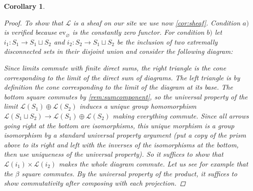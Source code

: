 \documentclass[11pt,A4]{article}
\theoremstyle{plain}
\newtheorem{cor}[thm]{Corollary}
\theoremstyle{definition}
\theoremstyle{remark}
\newcommand{\1}{\mathbbm{1}}
\newcommand{\F}{\mathcal{F}}
\renewcommand{\L}{\mathcal{L}}
\newcommand{\op}{\oplus}
\newcommand{\ev}{\mathrm{ev}}
\begin{document}
\begin{cor}
\begin{proof}
	To show that $\L$ is a sheaf on our site we use now \cref{cor:sheaf}.
	Condition $a)$ is verified because $\ev_{\varnothing}$ is the constantly zero functor.
	For condition $b)$ let $i_{1}\colon S_{1}\to S_{1}\sqcup S_{2}$ and $i_{2}\colon S_{2}\to S_{1}\sqcup S_{2}$ be the inclusion of two extremally disconnected sets in their disjoint union and consider the following diagram:
	\begin{center}
	\end{center}
	Since limits commute with finite direct sums, the right triangle is the cone corresponding to the limit of the direct sum of diagrams.
	The left triangle is by definition the cone corresponding to the limit of the diagram at its base.
	The bottom square commutes by \cref{rem:sumcomponent}, so the universal property of the limit $\L(S_{1})\op \L(S_{2})$ induces a unique group homomorphism $\L(S_{1}\sqcup S_{2})\to \L(S_{1})\op \L(S_{2})$ making everything commute.
	Since all arrows going right at the bottom are isomorphisms, this unique morphism is a group isomorphism by a standard universal property argument (put a copy of the prism above to its right and left with the inverses of the isomorphisms at the bottom, then use uniqueness of the universal property).
	So it suffices to show that $\L(i_{1})\times \L(i_{2})$ makes the whole diagram commute.
	Let us see for example that the $\beta$ square commutes.
	By the universal property of the product, it suffices to show commutativity after composing with each projection.

\end{proof}
\end{cor}
\end{document}
